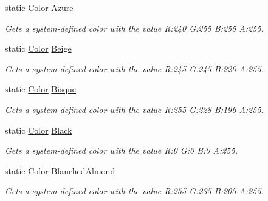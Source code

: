 \begin{DoxyCompactItemize}
static \hyperlink{struct_microsoft_1_1_xna_1_1_framework_1_1_color}{Color} \hyperlink{struct_microsoft_1_1_xna_1_1_framework_1_1_color_a7cc6e975d9a207b594ebba24ed9a2d34}{Azure}
\begin{DoxyCompactList}\small\item\em Gets a system-\/defined color with the value R\+:240 G\+:255 B\+:255 A\+:255.\end{DoxyCompactList}\item 
static \hyperlink{struct_microsoft_1_1_xna_1_1_framework_1_1_color}{Color} \hyperlink{struct_microsoft_1_1_xna_1_1_framework_1_1_color_ab85dfdc35e501160a91f5db6e9b93e92}{Beige}
\begin{DoxyCompactList}\small\item\em Gets a system-\/defined color with the value R\+:245 G\+:245 B\+:220 A\+:255.\end{DoxyCompactList}\item 
static \hyperlink{struct_microsoft_1_1_xna_1_1_framework_1_1_color}{Color} \hyperlink{struct_microsoft_1_1_xna_1_1_framework_1_1_color_a8b38892d4390e31b1665820b3d8955ad}{Bisque}
\begin{DoxyCompactList}\small\item\em Gets a system-\/defined color with the value R\+:255 G\+:228 B\+:196 A\+:255.\end{DoxyCompactList}\item 
static \hyperlink{struct_microsoft_1_1_xna_1_1_framework_1_1_color}{Color} \hyperlink{struct_microsoft_1_1_xna_1_1_framework_1_1_color_a3254bfc1043f3544ef9ab17b7c0b7160}{Black}
\begin{DoxyCompactList}\small\item\em Gets a system-\/defined color with the value R\+:0 G\+:0 B\+:0 A\+:255.\end{DoxyCompactList}\item 
static \hyperlink{struct_microsoft_1_1_xna_1_1_framework_1_1_color}{Color} \hyperlink{struct_microsoft_1_1_xna_1_1_framework_1_1_color_a9f746fe2681a20f9a18745a0e1e49d91}{Blanched\+Almond}
\begin{DoxyCompactList}\small\item\em Gets a system-\/defined color with the value R\+:255 G\+:235 B\+:205 A\+:255.\end{DoxyCompactList}\item 

\end{DoxyCompactItemize}
